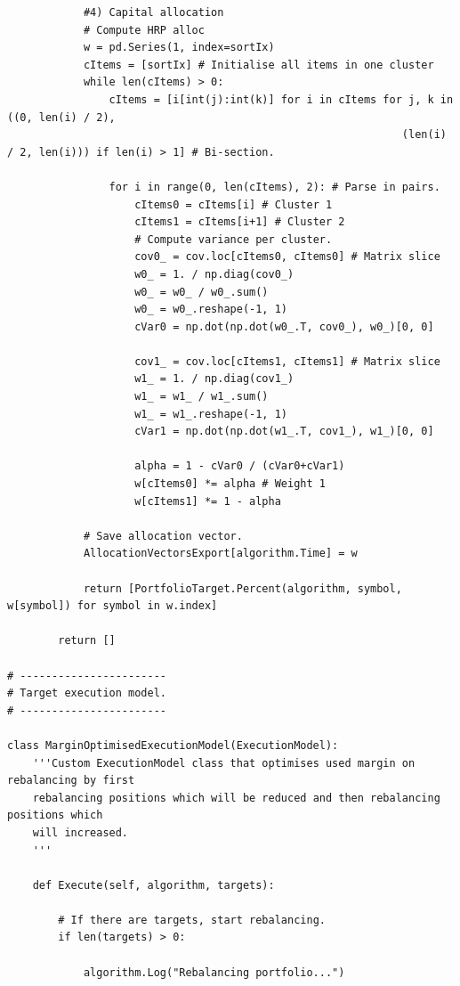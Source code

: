 \begin{verbatim}
            #4) Capital allocation
            # Compute HRP alloc
            w = pd.Series(1, index=sortIx)
            cItems = [sortIx] # Initialise all items in one cluster
            while len(cItems) > 0:
                cItems = [i[int(j):int(k)] for i in cItems for j, k in ((0, len(i) / 2),
                                                              (len(i) / 2, len(i))) if len(i) > 1] # Bi-section.
                    
                for i in range(0, len(cItems), 2): # Parse in pairs.
                    cItems0 = cItems[i] # Cluster 1
                    cItems1 = cItems[i+1] # Cluster 2
                    # Compute variance per cluster.
                    cov0_ = cov.loc[cItems0, cItems0] # Matrix slice
                    w0_ = 1. / np.diag(cov0_)
                    w0_ = w0_ / w0_.sum()
                    w0_ = w0_.reshape(-1, 1)
                    cVar0 = np.dot(np.dot(w0_.T, cov0_), w0_)[0, 0]
        
                    cov1_ = cov.loc[cItems1, cItems1] # Matrix slice
                    w1_ = 1. / np.diag(cov1_)
                    w1_ = w1_ / w1_.sum()
                    w1_ = w1_.reshape(-1, 1)
                    cVar1 = np.dot(np.dot(w1_.T, cov1_), w1_)[0, 0]
        
                    alpha = 1 - cVar0 / (cVar0+cVar1)
                    w[cItems0] *= alpha # Weight 1
                    w[cItems1] *= 1 - alpha
                
            # Save allocation vector.
            AllocationVectorsExport[algorithm.Time] = w
            
            return [PortfolioTarget.Percent(algorithm, symbol, w[symbol]) for symbol in w.index]
            
        return []

# -----------------------
# Target execution model.
# -----------------------
        
class MarginOptimisedExecutionModel(ExecutionModel):
    '''Custom ExecutionModel class that optimises used margin on rebalancing by first
    rebalancing positions which will be reduced and then rebalancing positions which
    will increased.
    '''
    
    def Execute(self, algorithm, targets):
        
        # If there are targets, start rebalancing.
        if len(targets) > 0:
            
            algorithm.Log("Rebalancing portfolio...")
            

\end{verbatim}

